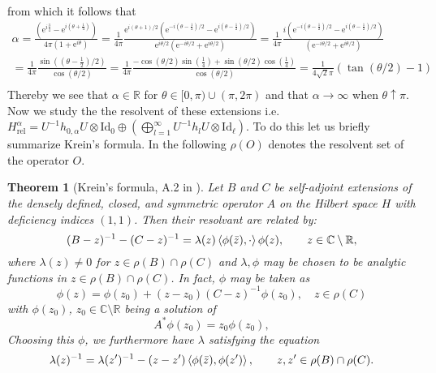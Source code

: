 \documentclass[a4paper,11pt]{article}
\newcommand{\euler}[1]{\text{e}^{#1}}
\newcommand{\R}{\mathbb{R}}
\newcommand{\C}{\mathbb{C}}
\newtheorem{theorem}{Theorem}
\begin{document}
from which it follows that \begin{equation}
\begin{aligned}
\alpha=\frac{(\euler{i\frac{3}{4}}-\euler{i(\theta+\frac{1}{4})})}{4\pi(1+\euler{i\theta})}=\frac{1}{4\pi}\frac{\euler{i(\theta+1)/2}(\euler{-i(\theta-\frac{1}{2})/2}-\euler{i(\theta-\frac{1}{2})/2})}{\euler{i\theta/2}(\euler{-i\theta/2}+\euler{i\theta/2})}=\frac{1}{4\pi}\frac{i(\euler{-i(\theta-\frac{1}{2})/2}-\euler{i(\theta-\frac{1}{2})/2})}{(\euler{-i\theta/2}+\euler{i\theta/2})}\\=\frac{1}{4\pi}\frac{\sin((\theta-\frac{1}{2})/2)}{\cos(\theta/2)}=\frac{1}{4\pi}\frac{-\cos(\theta/2)\sin(\frac{1}{4})+\sin(\theta/2)\cos(\frac{1}{4})}{\cos(\theta/2)}=\frac{1}{4\sqrt{2}\pi}\left(\tan(\theta/2)-1\right)\\
\end{aligned}
\end{equation}
Thereby we see that $ \alpha\in \R $ for $ \theta\in[0,\pi)\cup(\pi,2\pi) $ and that $ \alpha\to\infty $ when $ \theta\uparrow\pi $. Now we study the the resolvent of these extensions i.e. $ H_{\text{rel}}^{\alpha}=U^{-1}h_{0,\alpha}U\otimes\text{Id}_{0}\oplus\left(\bigoplus_{l=1}^{\infty}U^{-1}h_lU\otimes\text{Id}_{\ell} \right) $. To do this let us briefly summarize Krein's formula. In the following $ \rho(O) $ denotes the resolvent set of the operator $ O $.
\begin{theorem}[Krein's formula, A.2 in \cite{albeverio2012solvable}]
	\label{Krein's formula}
	Let $ B $ and $ C $ be self-adjoint extensions of the densely defined, closed, and symmetric operator $ A $ on the Hilbert space $ H $ with deficiency indices $ (1,1) $. Then their resolvant are related by:\begin{equation}
	(B-z)^{-1}-(C-z)^{-1}=\lambda(z)\braket{\phi(\bar{z}),\cdot}\phi(z),\qquad z\in\C\setminus\R,
	\end{equation}
	where $ \lambda(z)\neq0 $ for $ z\in\rho(B)\cap\rho(C) $ and $\lambda, \phi $ may be  chosen to be analytic functions in $ z\in\rho(B)\cap\rho(C) $. In fact, $ \phi $ may be taken as \begin{equation}
	\label{phi relation}
	\phi(z)=\phi(z_0)+(z-z_0)(C-z)^{-1}\phi(z_0),\quad z\in \rho(C)
	\end{equation}
	with $ \phi(z_0) $, $ z_0\in \C\setminus\R $ being a solution of \begin{equation}
	A^*\phi(z_0)=z_0\phi(z_0),
	\end{equation}
	Choosing this $ \phi $, we furthermore have $ \lambda $ satisfying the equation\begin{equation}
	\label{lambda relation}
	\lambda(z)^{-1}=\lambda(z')^{-1}-(z-z')\braket{\phi(\bar{z}),\phi(z')},\qquad z,z'\in\rho(B)\cap\rho(C).
	\end{equation}
\end{theorem}
\end{document}
